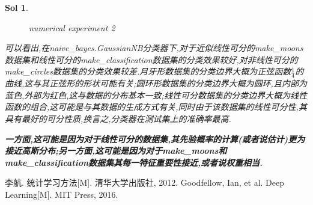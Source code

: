 \documentclass[UTF8,a4paper,11pt]{ctexart}
\newtheorem{sol}{Sol}[section]
\begin{document}
\begin{sol}
\begin{figure}[H]
	\caption{numerical experiment 2}
\end{figure}
\par 可以看出,在naive\_bayes.GaussianNB分类器下,对于近似线性可分的make\_moons数据集和线性可分的make\_classification数据集的分类效果较好,对非线性可分的make\_circles数据集的分类效果较差.月牙形数据集的分类边界大概为正弦函数$\frac{1}{4}$的曲线,这与其正弦形的形状可能有关;圆环形数据集的分类边界大概为圆环,且内部为蓝色,外部为红色,这与数据的分布基本一致;线性可分数据集的分类边界大概为线性函数的组合,这可能是与其数据的生成方式有关,同时由于该数据集的线性可分性,其具有最好的可分性质,换言之,分类器在测试集上的准确率最高.

\textbf{一方面,这可能是因为对于线性可分的数据集,其先验概率的计算(或者说估计)更为接近高斯分布;另一方面,这可能是因为对于make\_moons和make\_classification数据集其每一特征重要性接近,或者说权重相当.}
\end{sol}
\newpage
\begin{thebibliography}{3}  
	 李航. 统计学习方法[M]. 清华大学出版社, 2012.
	 Goodfellow, Ian, et al. Deep Learning[M]. MIT Press, 2016. 	
\end{thebibliography}
\end{document}
